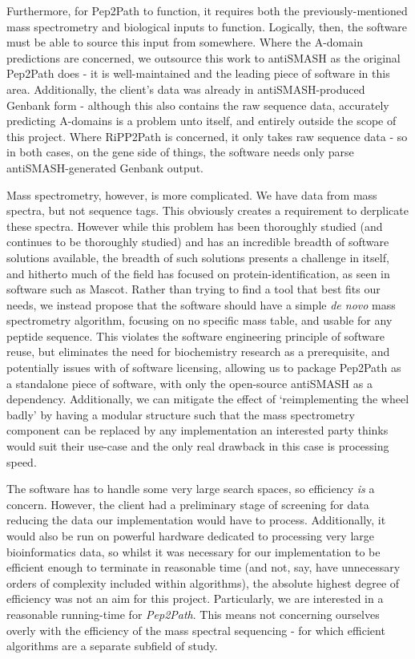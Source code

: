 \documentclass{l4proj}
\newcommand{\cit}[1]{\citep{#1}}
\begin{document}
Furthermore, for Pep2Path to function, it requires both the previously-mentioned mass spectrometry and biological inputs to function. Logically, then, the software must be able to source this input from somewhere. Where the A-domain predictions are concerned, we outsource this work to antiSMASH as the original Pep2Path does - it is well-maintained and the leading piece of software in this area. Additionally, the client's data was already in antiSMASH-produced Genbank form - although this also contains the raw sequence data, accurately predicting A-domains is a problem unto itself, and entirely outside the scope of this project. Where RiPP2Path is concerned, it only takes raw sequence data - so in both cases, on the gene side of things, the software needs only parse antiSMASH-generated Genbank output.

Mass spectrometry, however, is more complicated. We have data from mass spectra, but not sequence tags. This obviously creates a requirement to derplicate these spectra. However while this problem has been thoroughly studied (and continues to be thoroughly studied) and has an incredible breadth of software solutions available, the breadth of such solutions presents a challenge in itself, and hitherto much of the field has focused on protein-identification, \cit{msomics} as seen in software such as Mascot. \cit{mascot} Rather than trying to find a tool that best fits our needs, we instead propose that the software should have a simple \textit{de novo} mass spectrometry algorithm, focusing on no specific mass table, and usable for any peptide sequence. This violates the software engineering principle of software reuse, but eliminates the need for biochemistry research as a prerequisite, and potentially issues with of software licensing, allowing us to package Pep2Path as a standalone piece of software, with only the open-source antiSMASH as a dependency. Additionally, we can mitigate the effect of `reimplementing the wheel badly' by having a modular structure such that the mass spectrometry component can be replaced by any implementation an interested party thinks would suit their use-case and the only real drawback in this case is processing speed.

The software has to handle some very large search spaces, so efficiency \textit{is} a concern. However, the client had a preliminary stage of screening for data reducing the data our implementation would have to process. Additionally, it would also be run on powerful hardware dedicated to processing very large bioinformatics data, so whilst it was necessary for our implementation to be efficient enough to terminate in reasonable time (and not, say, have unnecessary orders of complexity included within algorithms), the absolute highest degree of efficiency was not an aim for this project. Particularly, we are interested in a reasonable running-time for \textit{Pep2Path}. This means not concerning ourselves overly with the efficiency of the mass spectral sequencing - for which efficient algorithms are a separate subfield of study.
\end{document}
